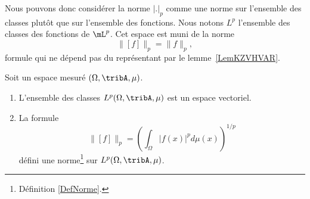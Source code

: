 Nous pouvons donc considérer la norme \( | . |_p\) comme une norme sur l'ensemble des classes plutôt que sur l'ensemble des fonctions. Nous notons \( L^p\) l'ensemble des classes des fonctions de \(\mL^p\). Cet espace est muni de la norme
\begin{equation}
	\| [f] \|_p=\| f \|_p,
\end{equation}
formule qui ne dépend pas du représentant par le lemme~\ref{LemKZVHVAR}.

\begin{proposition}     \label{PROPooTYCYooAKJWOX}
	Soit un espace mesuré \( (\Omega,\tribA,\mu)\).
	\begin{enumerate}
		\item
		      L'ensemble des classes \( L^p(\Omega,\tribA,\mu)\) est un espace vectoriel.
		\item
		      La formule
		      \begin{equation}
			      \| [f] \|_p=\left( \int_{\Omega}| f(x) |^pd\mu(x) \right)^{1/p}
		      \end{equation}
		      défini une norme\footnote{Définition \ref{DefNorme}.} sur \( L^p(\Omega,\tribA,\mu)\).
	\end{enumerate}
\end{proposition}


